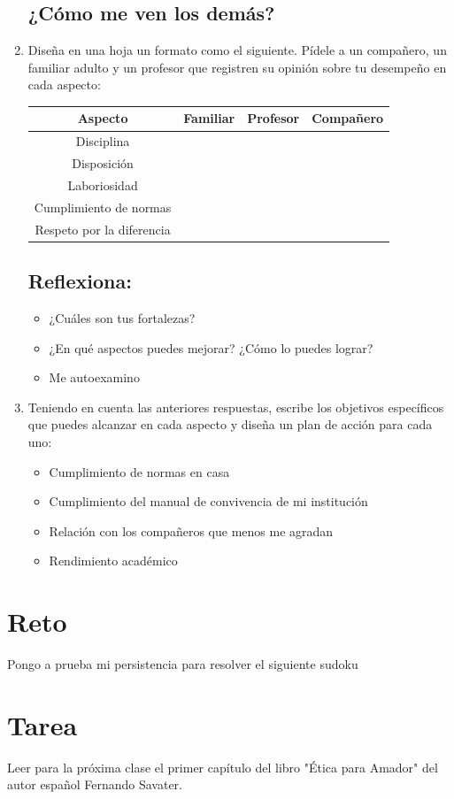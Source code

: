 \documentclass[10pt,twoside]{article}
\begin{document}
\begin{enumerate}
\subsection*{¿C\'{o}mo me ven los dem\'{a}s?}
\item Diseña en una hoja un formato como el siguiente. Pídele a un compañero, un familiar adulto y un profesor que registren su opinión sobre tu desempeño en cada aspecto:
\begin{center}
\begin{tabular}{|c|c|c|c|}
\hline 
\textbf{Aspecto} & \textbf{Familiar} & \textbf{Profesor} & \textbf{Compañero} \\ 
\hline 
Disciplina &  &  &  \\ 
\hline 
Disposición &  &  &  \\ 
\hline 
Laboriosidad &  &  &  \\ 
\hline 
Cumplimiento de normas &  &  &  \\ 
\hline 
Respeto por la diferencia &  &  &  \\ 
\hline 
\end{tabular} 
\end{center}
\subsection*{Reflexiona:}
\begin{itemize}
\item ¿Cuáles son tus fortalezas?
\item ¿En qué aspectos puedes mejorar? ¿Cómo lo puedes lograr?
\item Me autoexamino
\end{itemize}
\item Teniendo en cuenta las anteriores respuestas, escribe los objetivos específicos que puedes alcanzar en cada aspecto y diseña un plan de acción para cada uno:
\begin{itemize}
\item Cumplimiento de normas en casa
\item Cumplimiento del manual de convivencia de mi institución
\item Relación con los compañeros que menos me agradan
\item Rendimiento académico
\end{itemize}
\end{enumerate}
\section*{Reto}
Pongo a prueba mi persistencia para resolver el siguiente sudoku

\section*{Tarea}
Leer para la pr\'{o}xima clase el primer cap\'{i}tulo del libro "\'{E}tica para Amador" del autor español Fernando Savater.
\end{document}
